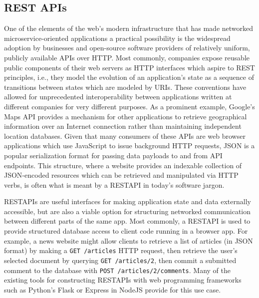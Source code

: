 \documentclass[../thesis]{subfiles}
\begin{document}
\subsection{REST APIs}
One of the elements of the web's modern infrastructure that has made
networked microservice-oriented applications a practical possibility
is the widespread adoption by businesses and open-source software
providers of relatively uniform, publicly available \glspl{API} over
HTTP. Most commonly, companies expose reusable public components of
their web servers as HTTP interfaces which aspire to \gls{REST}
principles, i.e., they model the evolution of an application's state
as a sequence of transitions between states which are modeled by
\glspl{URI}. These conventions have allowed for unprecedented
interoperability between applications written at different companies
for very different purposes. As a prominent example, Google's Maps
\gls{API} provides a mechanism for other applications to retrieve
geographical information over an Internet connection rather than
maintaining independent location databases. Given that many consumers
of these APIs are web browser applications which use JavaScript to
issue background HTTP requests, \gls{JSON} is a popular serialization
format for passing data payloads to and from API endpoints. This
structure, where a website provides an indexable collection of
\gls{JSON}-encoded resources which can be retrieved and manipulated
via HTTP verbs, is often what is meant by a \gls{RESTAPI} in today's
software jargon.

\glspl{RESTAPI} are useful interfaces for making application state and
data externally accessible, but are also a viable option for
structuring networked communication between different parts of the
same app. Most commonly, a \gls{RESTAPI} is used to provide structured
database access to client code running in a browser app. For example,
a news website might allow clients to retrieve a list of articles (in
\gls{JSON} format) by making a \texttt{GET /articles} HTTP request,
then retrieve the user's selected document by querying \texttt{GET
  /articles/2}, then commit a submitted comment to the database with
\texttt{POST /articles/2/comments}. Many of the existing tools for
constructing \glspl{RESTAPI} with web programming frameworks such as
Python's Flask \cite{Flask} or Express in NodeJS \cite{Express}
provide for this use case.
\end{document}
